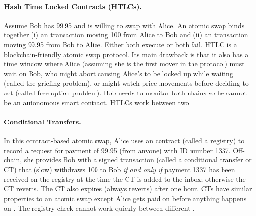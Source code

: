 \paragraph{Hash Time Locked Contracts (HTLCs).} Assume Bob has 99.95 \ethone and is willing to swap with Alice. An atomic swap binds together (i) an \layertwo transaction moving 100 \ethtwo from Alice to Bob and (ii) an \layerone transaction moving 99.95 \ethone from Bob to Alice. Either both execute or both fail. HTLC is a blockchain-friendly atomic swap protocol. Its main drawback is that it also has a time window where Alice (assuming she is the first mover in the protocol) must wait on Bob, who might abort causing Alice's \ethtwo to be locked up while waiting (called the griefing problem), or might watch price movements before deciding to act (called free option problem). Bob needs to monitor both chains so he cannot be an autonomous smart contract. HTLCs work between two \layertwos.

\paragraph{Conditional Transfers.} In this contract-based atomic swap, Alice uses an \layerone contract (called a registry) to record a request for payment of 99.95 \ethone (from anyone) with ID number 1337. Off-chain, she provides Bob with a signed \layertwo transaction (called a conditional transfer or CT) that (slow) withdraws 100 \ethtwo to Bob \textit{if and only if} payment 1337 has been received on the \layerone registry at the time the CT is added to the inbox; otherwise the CT reverts. The CT also expires (always reverts) after one hour. CTs have similar properties to an atomic swap except Alice gets paid on \layerone before anything happens on \layertwo. The registry check cannot work quickly between different \layertwos. 



